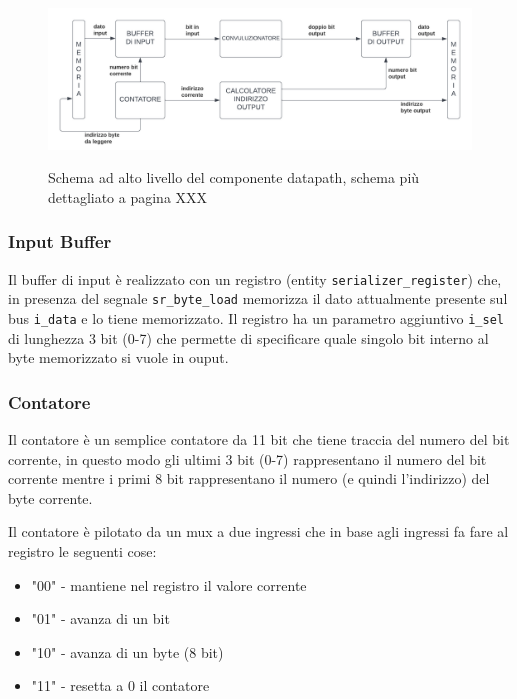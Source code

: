 \documentclass[12pt, a4paper]{article}
\begin{document}
\begin{figure}[h!]
    \centering
    \includegraphics[scale=0.32]{datapath.png}
    \label{fig:datapath_small}
    \caption{Schema ad alto livello del componente datapath, schema più dettagliato a pagina XXX} %
\end{figure}

\subsubsection{Input Buffer}

Il buffer di input è realizzato con un registro (entity \texttt{serializer\_register}) che, in presenza del segnale 
\texttt{sr\_byte\_load} memorizza il dato attualmente presente sul bus \texttt{i\_data} e lo tiene memorizzato.
Il registro ha un parametro aggiuntivo \texttt{i\_sel} di lunghezza 3 bit (0-7)
che permette di specificare quale singolo bit interno al byte memorizzato si vuole in ouput.

\subsubsection{Contatore}

Il contatore è un semplice contatore da 11 bit che tiene traccia del numero del bit corrente,
in questo modo gli ultimi 3 bit (0-7) rappresentano il numero del bit corrente
mentre i primi 8 bit rappresentano il numero (e quindi l'indirizzo) del byte corrente.
\pagebreak

\noindent Il contatore è pilotato da un mux a due ingressi che in base agli ingressi fa fare al registro le seguenti cose:
\begin{itemize}[itemsep=4pt, topsep=4pt]
    \item "00" - mantiene nel registro il valore corrente
    \item "01" - avanza di un bit
    \item "10" - avanza di un byte (8 bit)
    \item "11" - resetta a 0 il contatore
\end{itemize}
\end{document}
